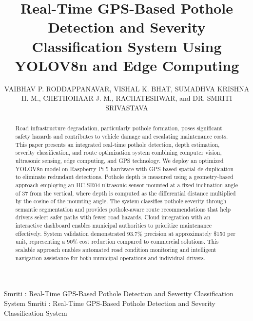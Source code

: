 \documentclass{ieeeaccess}
\begin{document}

\title{Real-Time GPS-Based Pothole Detection and Severity Classification System Using YOLOV8n and Edge Computing}
\author{\uppercase{Vaibhav P. Roddappanavar},
\uppercase{Vishal K. Bhat},
\uppercase{Sumadhva Krishna H. M.},
\uppercase{Chethohaar J. M.},
\uppercase{Rachateshwar}, and
\uppercase{Dr. Smriti Srivastava}}
\address[1]{Department of Computer Science, RV College of Engineering, Bengaluru, Karnataka 560059, India (e-mail: vaibhavpr.cs23@rvce.edu.in; vishalkbhat.cs23@rvce.edu.in; ; sumadhvak.cs23@rvce.edu.in;smritisrivastavarvce.edu.in)}
\address[1]{Department of Cyber Security, RV College of Engineering, Bengaluru, Karnataka 560059, India (e-mail: chethohaarjm.cy23@rvce.edu.in)}
\address[2]{Department of AI \& ML, RV College of Engineering, Bengaluru, Karnataka 560059, India (e-mail: rachateshwar.ai24@rvce.edu.in)}

\markboth
{Smriti \headeretal: Real-Time GPS-Based Pothole Detection and Severity Classification System}
{Smriti \headeretal: Real-Time GPS-Based Pothole Detection and Severity Classification System}


\begin{abstract}
Road infrastructure degradation, particularly pothole formation, poses significant safety hazards and contributes to vehicle damage and escalating maintenance costs. This paper presents an integrated real-time pothole detection, depth estimation, severity classification, and route optimization system combining computer vision, ultrasonic sensing, edge computing, and GPS technology. We deploy an optimized YOLOV8n model on Raspberry Pi 5 hardware with GPS-based spatial de-duplication to eliminate redundant detections. Pothole depth is measured using a geometry-based approach employing an HC-SR04 ultrasonic sensor mounted at a fixed inclination angle of 37\textdegree{} from the vertical, where depth is computed as the differential distance multiplied by the cosine of the mounting angle. The system classifies pothole severity through semantic segmentation and provides pothole-aware route recommendations that help drivers select safer paths with fewer road hazards. Cloud integration with an interactive dashboard enables municipal authorities to prioritize maintenance effectively. System validation demonstrated 93.7\% precision at approximately \$150 per unit, representing a 90\% cost reduction compared to commercial solutions. This scalable approach enables automated road condition monitoring and intelligent navigation assistance for both municipal operations and individual drivers.
\end{abstract}
\end{document}
